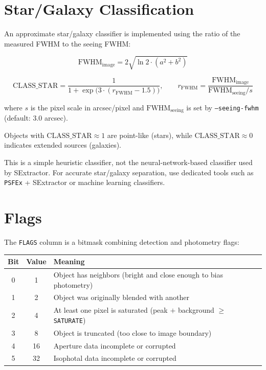 \documentclass[11pt,fleqn]{book}
\begin{document}
\section{Star/Galaxy Classification}

An approximate star/galaxy classifier is implemented using the ratio of the measured FWHM to the seeing FWHM:

\begin{equation}
\text{FWHM}_{\text{image}} = 2\sqrt{\ln 2 \cdot (a^2 + b^2)}
\end{equation}

\begin{equation}
\text{CLASS\_STAR} = \frac{1}{1 + \exp\!\bigl(3 \cdot (r_{\text{FWHM}} - 1.5)\bigr)}, \qquad
r_{\text{FWHM}} = \frac{\text{FWHM}_{\text{image}}}{\text{FWHM}_{\text{seeing}} / s}
\end{equation}

where $s$ is the pixel scale in arcsec/pixel and $\text{FWHM}_{\text{seeing}}$ is set by \texttt{--seeing-fwhm} (default: 3.0 arcsec).

Objects with $\text{CLASS\_STAR} \approx 1$ are point-like (stars), while $\text{CLASS\_STAR} \approx 0$ indicates extended sources (galaxies).

\begin{remark}
This is a simple heuristic classifier, not the neural-network-based classifier used by SExtractor. For accurate star/galaxy separation, use dedicated tools such as \texttt{PSFEx} + SExtractor or machine learning classifiers.
\end{remark}


\section{Flags}

The \texttt{FLAGS} column is a bitmask combining detection and photometry flags:

\begin{center}
\begin{tabular}{ccl}
\toprule
\textbf{Bit} & \textbf{Value} & \textbf{Meaning} \\
\midrule
0 & 1 & Object has neighbors (bright and close enough to bias photometry) \\
1 & 2 & Object was originally blended with another \\
2 & 4 & At least one pixel is saturated (peak $+$ background $\geq$ \texttt{SATURATE}) \\
3 & 8 & Object is truncated (too close to image boundary) \\
4 & 16 & Aperture data incomplete or corrupted \\
5 & 32 & Isophotal data incomplete or corrupted \\
\bottomrule
\end{tabular}
\end{center}
\end{document}
